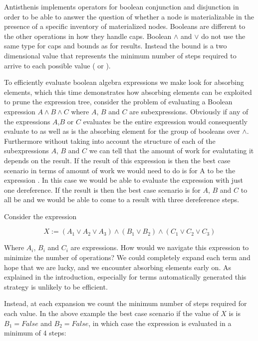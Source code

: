 Antisthenis implements operators for boolean conjunction and
disjunction in order to be able to answer the question of whether a
node is materializable in the presence of a specific inventory of
materialized nodes. Booleans are different to the other operations in
how they handle caps. Boolean \(\land\) and \(\lor\) do not use the
same type for caps and bounds as for results. Instead the bound is a
two dimensional value that represents the minimum number of steps
required to arrive to each possible value ( or
).

To efficiently evaluate boolean algebra expressions we make look for
absorbing elements, which this time demonstrates how absorbing
elements can be exploited to prune the expression tree, consider the
problem of evaluating a Boolean expression \(A \land B \land C\) where
\(A\), \(B\) and \(C\) are subexpressions. Obviously if any of the
expressions \(A\),\(B\) or \(C\) evaluates be  the entire
expression would consequently evaluate to  as well as
 is the absorbing element for the group of booleans over
\(\land\). Furthermore without taking into account the structure of
each of the subexpressions \(A\), \(B\) and \(C\) we can tell that the
amount of work for evalutating it depends on the result. If the result
of this expression is  then the best case scenario in
terms of amount of work we would need to do is for A to be the
expression . In this case we would be able to evaluate the
expression with just one dereference. If the result is 
then the best case scenario is for \(A\), \(B\) and \(C\) to all be
 and we would be able to come to a result with three
dereference steps.

Consider the expression

\[
X := (A_1 \lor A_2 \lor A_3) \land (B_1 \lor B_2) \land (C_1 \lor C_2 \lor C_3)
\]

Where \(A_i\), \(B_i\) and \(C_i\) are expressions. How would we
navigate this expression to minimize the number of operations?  We
could completely expand each term and hope that we are lucky, and we
encounter absorbing elements early on. As explained in the
introduction, especially for terms automatically generated this
strategy is unlikely to be efficient.

Instead, at each expansion we count the minimum number of steps
required for each value. In the above example the best case scenario
if the value of \(X\) is  is \(B_1 = False\) and
\(B_2 = False\), in which case the expression is evaluated in a
minimum of 4 steps:

